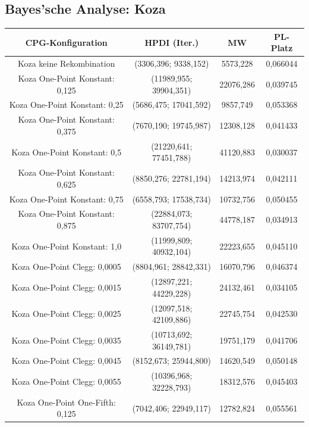 \subsection{Bayes'sche Analyse: Koza}
\label{subsec:bayesKoza}

\begin{table}[H]
	\centering
	\begin{tabular}{c | c | c | c}
		\textbf{CPG-Konfiguration} & \textbf{HPDI (Iter.)} & \textbf{MW} & \textbf{PL-Platz}\\
		\hline
		Koza keine Rekombination & (3306,396; 9338,152) & 5573,228 & 0,066044\\
		\hline
		Koza One-Point Konstant: 0,125 & (11989,955; 39904,351) & 22076,286 & 0,039745\\
		\hline
		Koza One-Point Konstant: 0,25 & (5686,475; 17041,592) & 9857,749 & 0,053368\\
		\hline
		Koza One-Point Konstant: 0,375 & (7670,190; 19745,987) & 12308,128 & 0,041433\\
		\hline
		Koza One-Point Konstant: 0,5 & (21220,641; 77451,788) & 41120,883 & 0,030037\\
		\hline
		Koza One-Point Konstant: 0,625 & (8850,276; 22781,194) & 14213,974 & 0,042111\\
		\hline
		Koza One-Point Konstant: 0,75 & (6558,793; 17538,734) & 10732,756 & 0,050455\\
		\hline
		Koza One-Point Konstant: 0,875 & (22884,073; 83707,754) & 44778,187 & 0,034913\\
		\hline
		Koza One-Point Konstant: 1,0 & (11999,809; 40932,104) & 22223,655 & 0,045110\\
		\hline
		Koza One-Point Clegg: 0,0005 & (8804,961; 28842,331) & 16070,796 & 0,046374\\
		\hline
		Koza One-Point Clegg: 0,0015 & (12897,221; 44229,228) & 24132,461 & 0,034105\\
		\hline
		Koza One-Point Clegg: 0,0025 & (12097,518; 42109,886) & 22745,754 & 0,042530\\
		\hline
		Koza One-Point Clegg: 0,0035 & (10713,692; 36149,781) & 19751,179 & 0,041706\\
		\hline
		Koza One-Point Clegg: 0,0045 & (8152,673; 25944,800) & 14620,549 & 0,050148\\
		\hline
		Koza One-Point Clegg: 0,0055 & (10396,968; 32228,793) & 18312,576 & 0,045403\\
		\hline
		Koza One-Point One-Fifth: 0,125 & (7042,406; 22949,117) & 12782,824 & 0,055561\\

\end{tabular}
\end{table}

